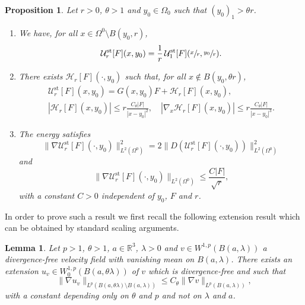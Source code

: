 \documentclass[10pt]{amsart}
\newcommand{\st}{\mathrm{st}}
\theoremstyle{plain}
\newtheorem{prop}[thm]{Proposition}
\newtheorem{lemme}[thm]{Lemma}
\theoremstyle{definition}
\let\na\nabla
\newcommand{\R}{\mathbb{R}}
\begin{document}
\begin{prop}\label{prop:stokeslet}
Let $r>0$, $\theta>1$ and $y_0 \in \Omega_0$ such that $ (y_0)_1> \theta r$.
\begin{enumerate}
\item We have, for all $x \in \Omega^0 \setminus B(y_0,r)$,\label{ref:it1}
\[
\mathcal{U}^{\st}_{r}[F](x,y_0)= \frac{1}{r}\, \mathcal{U}^{\st}_{1}[F](\sfrac{x}{r},\sfrac{y_0}{r}).
\]

\item There exists $\mathcal{H}_r[F](\cdot,y_0)$ such that, for all $ x \not \in B(y_0,\theta r)$, \label{ref:it2}
\begin{gather}\label{eq:decomposition_stokeslet}
\mathcal{U}^{\st}_{r}[F](x,y_0)= G(x,y_0)F + \mathcal{H}_r[F](x,y_0),
\\
\label{eq:decay_rest_stokeslet}
\left|\mathcal{H}_r[F](x,y_0) \right|\leq r \frac{C_\theta|F| }{|x-y_0|^2}, \quad \left|\nabla_x \mathcal{H}_r[F](x,y_0) \right|\leq r \frac{C_\theta |F|}{|x-y_0|^3}.
\end{gather}
\item The energy satisfies \label{ref:it3}
\[
\|\nabla \mathcal{U}^{\st}_r[F](\cdot,y_0)\|_{L^2(\Omega^0)}^2=2\|D \left(\mathcal{U}^{\st}_r[F](\cdot,y_0) \right) \|_{L^2(\Omega^0)}^2
\]
and
\begin{equation}\label{eq:energy}
\|\nabla \mathcal{U}^{\st}_r[F](\cdot,y_0)\|_{L^2(\Omega^0)}\leq \frac{C|F|}{\sqrt{r}},
\end{equation}
with a constant $C>0$ independent of $y_0$, $F$ and $r$.
\end{enumerate}
\end{prop}
In order to prove such a result we first recall the following extension result which can be obtained by standard scaling arguments.
\begin{lemme}\label{lemme:extension}
Let $p>1$, $\theta>1$, $a \in \R^3$, $\lambda>0$ and $v \in W^{1,p}(B(a,\lambda))$ a divergence-free velocity field with vanishing mean on $B(a,\lambda)$. There exists an extension $u_v \in W^{1,p}_0(B(a,\theta \lambda))$
of $v$ which is divergence-free and such that
\[
\|\na u_v\|_{L^p(B(a,\theta \lambda) \setminus B(a,\lambda))} \leq C_\theta \|\nabla v\|_{L^p(B(a,\lambda))},
\]
with a constant depending only on $\theta$ and $p$ and not on $\lambda$ and $a$.
\end{lemme}
\end{document}
